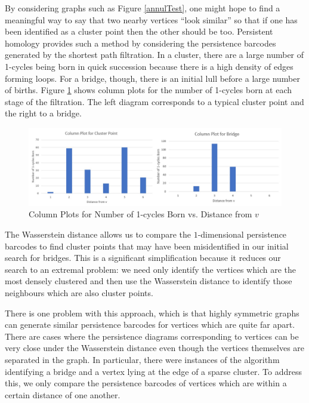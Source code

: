 \documentclass[12pt,a4paper]{amsart}
\numberwithin{equation}{section}
\theoremstyle{plain}
\theoremstyle{definition}
\begin{document}
By considering graphs such as Figure \ref{annulTest}, one might hope to find a meaningful way to say that two nearby vertices ``look similar'' so that if one has been identified as a cluster point then the other should be too. Persistent homology provides such a method by considering the persistence barcodes generated by the shortest path filtration. In a cluster, there are a large number of 1-cycles being born in quick succession because there is a high density of edges forming loops. For a bridge, though, there is an initial lull before a large number of births. Figure \ref{columnPlots} shows column plots for the number of 1-cycles born at each stage of the filtration. The left diagram corresponds to a typical cluster point and the right to a bridge.

\begin{figure}[h]
	\centering
	\includegraphics[scale=0.65]{ColumnPlots.jpg}
	\caption{Column Plots for Number of 1-cycles Born vs. Distance from $v$}
	\label{columnPlots}
\end{figure}

\newpage

The Wasserstein distance allows us to compare the $1$-dimensional persistence barcodes to find cluster points that may have been misidentified in our initial search for bridges. This is a significant simplification because it reduces our search to an extremal problem: we need only identify the vertices which are the most densely clustered and then use the Wasserstein distance to identify those neighbours which are also cluster points. 

There is one problem with this approach, which is that highly symmetric graphs can generate similar persistence barcodes for vertices which are quite far apart. There are cases where the persistence diagrams corresponding to vertices can be very close under the Wasserstein distance even though the vertices themselves are separated in the graph. In particular, there were instances of the algorithm identifying a bridge and a vertex lying at the edge of a sparse cluster. To address this, we only compare the persistence barcodes of vertices which are within a certain distance of one another.
\end{document}
